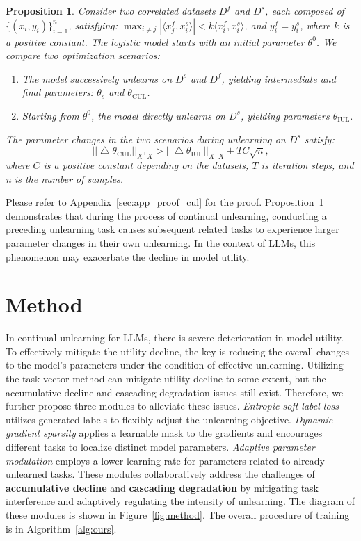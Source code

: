 \documentclass{article}
\theoremstyle{plain}
\newtheorem{proposition}[theorem]{Proposition}
\theoremstyle{definition}
\theoremstyle{remark}
\begin{document}
\begin{proposition}
Consider two correlated datasets $D^f$ and $D^s$, each composed of $\{(x_i, y_i)\}_{i=1}^n$, satisfying:
$\max_{i\neq j}|\langle x^f_j,x^s_i\rangle|<k\langle x^f_i,x^s_i\rangle$, and $y_i^f=y_i^s$, where $k$ is a positive constant. 
The logistic model starts with an initial parameter $\theta^0$.
We compare two optimization scenarios:
\begin{enumerate}
    \item The model successively unlearns on $D^s$ and $D^f$, yielding intermediate and final parameters: $\theta_s$ and $\theta_{\text{CUL}}$.
    \item Starting from $\theta^0$, the model directly unlearns on $D^s$, yielding parameters $\theta_{\text{IUL}}$.
\end{enumerate}
The parameter changes in the two scenarios during unlearning on $D^s$ satisfy:
\begin{equation}
    ||\bigtriangleup\theta_\text{CUL}||_{X^\top X}>||\bigtriangleup\theta_\text{IUL}||_{X^\top X}+TC\sqrt{n},
\end{equation}
where $C$ is a positive constant depending on the datasets, $T$ is iteration steps, and n is the number of samples.
\label{prop:cul}
\end{proposition}
Please refer to Appendix~\ref{sec:app_proof_cul} for the proof.
Proposition~\ref{prop:cul} demonstrates that during the process of continual unlearning, conducting a preceding unlearning task causes subsequent related tasks to experience larger parameter changes in their own unlearning.
In the context of LLMs, this phenomenon may exacerbate the decline in model utility.

\section{Method}
\label{sec:method}

In continual unlearning for LLMs, there is severe deterioration in model utility.
To effectively mitigate the utility decline, the key is reducing the overall changes to the model's parameters under the condition of effective unlearning.
Utilizing the task vector method can mitigate utility decline to some extent, but the accumulative decline and cascading degradation issues still exist.
Therefore, we further propose three modules to alleviate these issues.
\textit{Entropic soft label loss} utilizes generated labels to flexibly adjust the unlearning objective. \textit{Dynamic gradient sparsity} applies a learnable mask to the gradients and encourages different tasks to localize distinct model parameters. \textit{Adaptive parameter modulation} employs a lower learning rate for parameters related to already unlearned tasks.
These modules collaboratively address the challenges of \textbf{accumulative decline} and \textbf{cascading degradation} by mitigating task interference and adaptively regulating the intensity of unlearning. The diagram of these modules is shown in Figure~\ref{fig:method}. The overall procedure of training is in Algorithm~\ref{alg:ours}.
\end{document}
